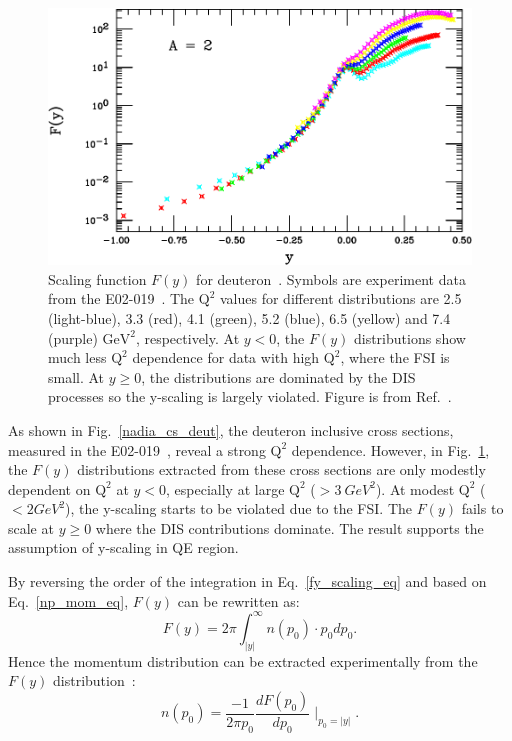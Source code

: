  \begin{figure}[!ht]
  \begin{center}
    \includegraphics[type=pdf,ext=.pdf,read=.pdf,width=0.80\linewidth]{./figures/physics/xemdeutfy}
    \caption[Scaling function $F(y)$ for deuteron]{\footnotesize{Scaling function $F(y)$ for deuteron~\cite{PhysRevLett.108.092502}. Symbols are experiment data from the E02-019~\cite{nadia_thesis}. The $\mathrm{Q^{2}}$ values for different distributions are 2.5 (light-blue), 3.3 (red), 4.1 (green), 5.2 (blue), 6.5 (yellow) and 7.4 (purple) $\mathrm{GeV^{2}}$, respectively. At $y<0$, the $F(y)$ distributions show much less $\mathrm{Q^{2}}$ dependence for data with high $\mathrm{Q^{2}}$, where the FSI is small. At $y\ge 0$, the distributions are dominated by the DIS processes so the y-scaling is largely violated. Figure is from Ref.~\cite{nadia_thesis}.}}
    \label{y_scaling_deut}
  \end{center}
\end{figure}

As shown in Fig.~\ref{nadia_cs_deut}, the deuteron inclusive cross sections, measured in the E02-019~\cite{nadia_thesis}, reveal a strong $\mathrm{Q^{2}}$ dependence. However, in Fig.~\ref{y_scaling_deut}, the $F(y)$ distributions extracted from these cross sections are only modestly dependent on $\mathrm{Q^{2}}$ at $y<0$, especially at large $\mathrm{Q^{2}}$ ($>3~GeV^{2}$). At modest $\mathrm{Q^{2}}$ ($< 2 GeV^{2}$), the y-scaling starts to be violated due to the FSI. The $F(y)$ fails to scale at $y\ge 0$ where the DIS contributions dominate. The result supports the assumption of y-scaling in QE region.

By reversing the order of the integration in Eq.~\ref{fy_scaling_eq} and based on Eq.~\eqref{np_mom_eq}, $F(y)$ can be rewritten as:
\begin{equation}
  F(y) = 2\pi\int_{|y|}^{\infty}n(p_{0})\cdot p_{0}dp_{0}.
  \label{fy_mom_eq}
\end{equation} 
Hence the momentum distribution can be extracted experimentally from the $F(y)$ distribution~\cite{qe_donal}:
\begin{equation}
  n(p_{0}) = \frac{-1}{2\pi p_{0}}\frac{dF(p_{0})}{dp_{0}} \mid_{p_{0}=|y|}.
  \label{mom_dis_fy}
\end{equation}

